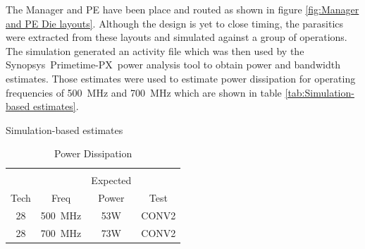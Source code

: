 \documentclass[journal]{IEEEtran}
\begin{document}
The Manager and PE have been place and routed as shown in figure \ref{fig:Manager and PE Die layouts}. Although the design is yet to close timing, the parasitics
were extracted from these layouts and simulated against a group of operations. The simulation generated an activity file which was then used by the 
Synopsys\textregistered ~Primetime-PX\texttrademark ~power analysis tool to obtain power and bandwidth estimates. Those estimates were used to estimate power dissipation for operating frequencies of \SI{500}{\mega\hertz} and \SI{700}{\mega\hertz}
which are shown in table \ref{tab:Simulation-based estimates}.

\begin{table}[h]
  \captionsetup{justification=centering, skip=3pt}
  \caption{Simulation-based estimates}
  \vspace{3pt}
  \label{tab:Simulation-based estimates}
  \centering
  \begin{subtable}{0.5\textwidth}
    \centering
    \begin{adjustbox}{width=0.9\textwidth}
      \begin{tabular}{cccc}
        \toprule
                         &                       &          &                                       \\  %
                         &                       & Expected &                                       \\  %
                   Tech  & Freq                  &  Power   &  Test \cite{krizhevsky2012imagenet}   \\  %
        \hline  %
                   28    & \SI{500}{\mega\hertz} &   53W    &  CONV2                                \\ %
                   28    & \SI{700}{\mega\hertz} &   73W    &  CONV2                                \\ %
        \bottomrule
      \end{tabular}
    \end{adjustbox}
    \vspace{3pt}
    \captionsetup{justification=centering, skip=10pt}
    \caption{Power Dissipation}
    \label{tab:Power Dissipation}

\end{subtable}
\end{table}
\end{document}
